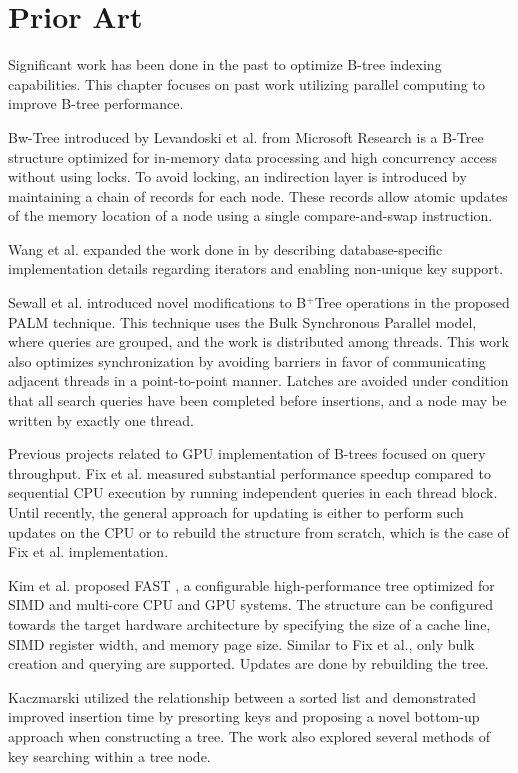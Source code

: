 \section{Prior Art}

Significant work has been done in the past to optimize B-tree indexing capabilities. This chapter focuses on past work utilizing parallel computing to improve B-tree performance.

Bw-Tree introduced by Levandoski et al. \cite{bw-tree} from Microsoft Research is a B-Tree structure optimized for in-memory data processing and high concurrency access without using locks. To avoid locking, an indirection layer is introduced by maintaining a chain of records for each node. These records allow atomic updates of the memory location of a node using a single compare-and-swap instruction.

Wang et al. \cite{openbw-tree} expanded the work done in \cite{bw-tree} by describing database-specific implementation details regarding iterators and enabling non-unique key support.

Sewall et al. \cite{palm} introduced novel modifications to B$^+$Tree operations in the proposed PALM technique. This technique uses the Bulk Synchronous Parallel model, where queries are grouped, and the work is distributed among threads. This work also optimizes synchronization by avoiding barriers in favor of communicating adjacent threads in a point-to-point manner. Latches are avoided under condition that all search queries have been completed before insertions, and a node may be written by exactly one thread.

Previous projects related to GPU implementation of B-trees focused on query throughput. Fix et al. \cite{fix2011accelerating} measured substantial performance speedup compared to sequential CPU execution by running independent queries in each thread block. Until recently, the general approach for updating is either to perform such updates on the CPU or to rebuild the structure from scratch, which is the case of Fix et al. implementation.

Kim et al. proposed FAST \cite{fast}, a configurable high-performance tree optimized for SIMD and multi-core CPU and GPU systems. The structure can be configured towards the target hardware architecture by specifying the size of a cache line, SIMD register width, and memory page size. Similar to Fix et al., only bulk creation and querying are supported. Updates are done by rebuilding the tree.

Kaczmarski \cite{kaczmarski} utilized the relationship between a sorted list and demonstrated improved insertion time by presorting keys and proposing a novel bottom-up approach when constructing a tree. The work also explored several methods of key searching within a tree node.


